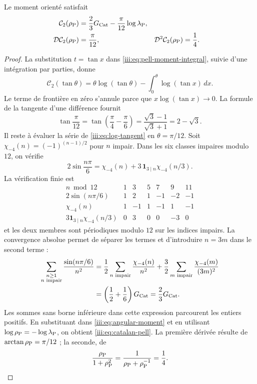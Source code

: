 \begin{theorem}
\label{iii:thm:catalan-pell}
Le moment orienté satisfait
\begin{align}
 \mathcal C_2(\rho_{\rm P})
 &=\frac23G_{\rm Cat}-\frac{\pi}{12}\log\lambda_{\rm P},
 \label{iii:eq:catalan-pell}\\
 \mathcal D\mathcal C_2(\rho_{\rm P})&=\frac{\pi}{12},&
 \mathcal D^2\mathcal C_2(\rho_{\rm P})&=\frac14.
 \label{iii:eq:catalan-pell-derivatives}
\end{align}
\end{theorem}
\begin{proof}
La substitution $t=\tan x$ dans \eqref{iii:eq:pell-moment-integral},
suivie d’une intégration par parties, donne
\begin{equation}
 \mathcal C_2(\tan\theta)
 =\theta\log(\tan\theta)
   -\int_0^\theta\log(\tan x)\,dx.
 \label{iii:eq:angular-moment}
\end{equation}
Le terme de frontière en zéro s’annule parce que $x\log(\tan x)\to0$.
La formule de la tangente d’une différence fournit
\[
 \tan\frac{\pi}{12}
 =\tan\left(\frac\pi4-\frac\pi6\right)
 =\frac{\sqrt3-1}{\sqrt3+1}=2-\sqrt3.
\]
Il reste à évaluer la série de \eqref{iii:eq:log-tangent} en
$\theta=\pi/12$. Soit $\chi_{-4}(n)=(-1)^{(n-1)/2}$ pour $n$ impair.
Dans les six classes impaires modulo $12$, on vérifie
\begin{equation}
 2\sin\frac{n\pi}{6}
 =\chi_{-4}(n)+3\,\mathbf1_{3\mid n}\chi_{-4}(n/3).
 \label{iii:eq:character-pell}
\end{equation}
La vérification finie est
\[
\begin{array}{c|rrrrrr}
 n\bmod12&1&3&5&7&9&11\\ \hline
 2\sin(n\pi/6)&1&2&1&-1&-2&-1\\
 \chi_{-4}(n)&1&-1&1&-1&1&-1\\
 3\mathbf1_{3\mid n}\chi_{-4}(n/3)&0&3&0&0&-3&0
\end{array}
\]
et les deux membres sont périodiques modulo $12$ sur les indices impairs.
La convergence absolue permet de séparer les termes et d’introduire $n=3m$
dans le second terme :
\begin{align*}
 \sum_{\substack{n\geq1\\n\text{ impair}}}
       \frac{\sin(n\pi/6)}{n^2}
 &=\frac12\sum_{n\text{ impair}}\frac{\chi_{-4}(n)}{n^2}
  +\frac32\sum_{m\text{ impair}}\frac{\chi_{-4}(m)}{(3m)^2}\\
 &=\left(\frac12+\frac16\right)G_{\rm Cat}
 =\frac23G_{\rm Cat}.
\end{align*}
Les sommes sans borne inférieure dans cette expression parcourent les entiers
positifs. En substituant dans \eqref{iii:eq:angular-moment} et en utilisant
$\log\rho_{\rm P}=-\log\lambda_{\rm P}$, on obtient
\eqref{iii:eq:catalan-pell}. La première dérivée résulte de
$\arctan\rho_{\rm P}=\pi/12$ ; la seconde, de
\[
 \frac{\rho_{\rm P}}{1+\rho_{\rm P}^2}
 =\frac1{\rho_{\rm P}+\rho_{\rm P}^{-1}}=\frac14.
\]
\end{proof}

